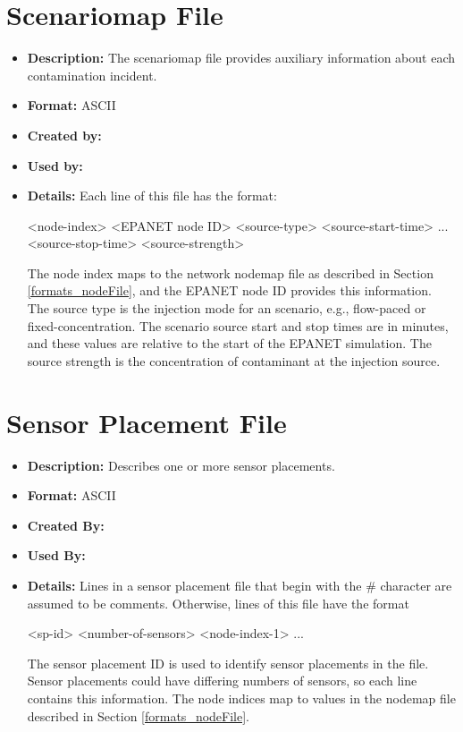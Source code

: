 \section{Scenariomap File}\label{formats_scenarioFile}
\begin{itemize}
\item {\bfseries Description:} The scenariomap file provides auxiliary information about each contamination incident. 
\item {\bfseries Format:} ASCII 
\item {\bfseries Created by:}  
\item {\bfseries Used by:}  
\item {\bfseries Details:} Each line of this file has the format:
\begin{unknownListing}
   <node-index> <EPANET node ID> <source-type> <source-start-time> ...
			<source-stop-time> <source-strength>
\end{unknownListing}
The node index maps to the network nodemap file as described in Section \ref{formats_nodeFile}, and the EPANET node ID provides 
this information. The source type is the injection mode for an scenario, e.g., 
flow-\/paced or fixed-\/concentration. The scenario source start and stop times are in minutes, and these values are relative to the 
start of the EPANET simulation. The source strength is the concentration of contaminant at the injection source. 
\end{itemize}


\section{Sensor Placement File}\label{formats_sensorPlacementFile}
\begin{itemize}
\item {\bfseries Description:} Describes one or more sensor placements. 
\item {\bfseries Format:} ASCII 
\item {\bfseries Created By:}  
\item {\bfseries Used By:}  
\item {\bfseries Details:} Lines in a sensor placement file that begin with 
the \# character are assumed to be comments. Otherwise, lines of this file have the format
\begin{unknownListing}
   <sp-id> <number-of-sensors> <node-index-1> ...
\end{unknownListing}
The sensor placement ID is used to identify sensor placements in the file. Sensor 
placements could have differing numbers of sensors, so each line contains this 
information. The node indices map to values in the nodemap file described in Section \ref{formats_nodeFile}. 
\end{itemize}

